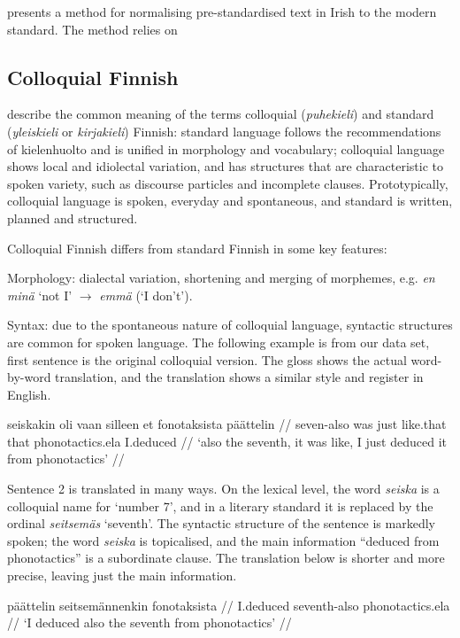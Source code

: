 \documentclass[11pt]{article}
\begin{document}
 presents a method for normalising pre-standardised text in Irish to 
the modern standard. The method relies on 

\subsection{Colloquial Finnish}


\cite{viinikka2013} describe the common meaning of the terms colloquial (\emph{puhekieli}) and standard (\emph{yleiskieli} or \emph{kirjakieli}) Finnish: standard language follows the recommendations of kielenhuolto and is unified in morphology and vocabulary; colloquial language shows local and idiolectal variation, and has structures that are characteristic to spoken variety,  such as discourse particles and incomplete clauses.
Prototypically, colloquial language is spoken, everyday and spontaneous, and standard is written, planned and structured. 

Colloquial Finnish differs from standard Finnish in some key features: 

Morphology: dialectal variation, shortening and merging of morphemes, e.g. \emph{en min\"{a}} `not I' $\rightarrow$ \emph{emm\"{a}} (`I don't').

Syntax: due to the spontaneous nature of colloquial language, syntactic structures are common for spoken language. The following example is from our data set, first sentence is the original colloquial version. The gloss shows the actual word-by-word translation, and the translation shows a similar style and register in English.

\ex
\begingl
\gla seiskakin oli vaan silleen et fonotaksista p\"{a}\"{a}ttelin //
\glb seven-{\sc also} was just like.that that phonotactics.{\sc ela} I.deduced //
\glft `also the seventh, it was like, I just deduced it from phonotactics' //
\endgl
\xe

Sentence 2 is translated in many ways. On the lexical level, the word \emph{seiska} is a colloquial name for `number 7', and in a literary standard it is replaced by the ordinal \emph{seitsemäs} `seventh'. The syntactic structure of the sentence is markedly spoken; the word \emph{seiska} is topicalised, and the main information ``deduced from phonotactics'' is a subordinate clause. 
The translation below is shorter and more precise, leaving just the main information.

\ex
\begingl
\gla p\"{a}\"{a}ttelin seitsem\"{a}nnenkin fonotaksista //
\glb I.deduced seventh-{\sc also} phonotactics.{\sc ela} //
\glft `I deduced also the seventh from phonotactics' //
\endgl
\xe
\end{document}
